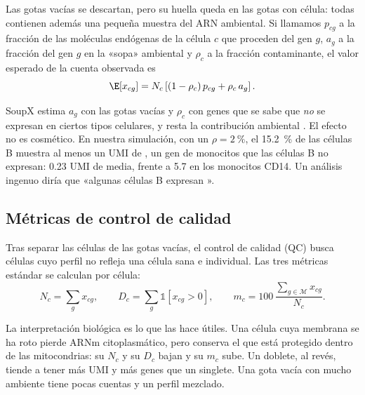 Las gotas vacías se descartan, pero su huella queda en las gotas con célula: todas contienen además una pequeña muestra del ARN ambiental. Si llamamos $p_{cg}$ a la fracción de las moléculas endógenas de la célula $c$ que proceden del gen $g$, $a_g$ a la fracción del gen $g$ en la «sopa» ambiental y $\rho_c$ a la fracción contaminante, el valor esperado de la cuenta observada es
\begin{equation}\label{eq:12-ambiente}
\E[x_{cg}] = N_c\left[(1-\rho_c)\,p_{cg} + \rho_c\,a_g\right].
\end{equation}
\begin{simbolos}
\end{simbolos}
SoupX estima $a_g$ con las gotas vacías y $\rho_c$ con genes que se sabe que \emph{no} se expresan en ciertos tipos celulares, y resta la contribución ambiental \parencite{c12-young2020}. El efecto no es cosmético. En nuestra simulación, con un $\rho=\SI{2}{\percent}$, el \SI{15.2}{\percent} de las células B muestra al menos un UMI de , un gen de monocitos que las células B no expresan: \num{0.23} UMI de media, frente a \num{5.7} en los monocitos CD14. Un análisis ingenuo diría que «algunas células B expresan ».

\subsection{Métricas de control de calidad}

Tras separar las células de las gotas vacías, el control de calidad (QC) busca células cuyo perfil no refleja una célula sana e individual. Las tres métricas estándar \parencite{c12-luecken2019} se calculan por célula:
\begin{equation}\label{eq:12-qc}
N_c=\sum_{g} x_{cg},\qquad
D_c=\sum_g \mathbb{1}[x_{cg}>0],\qquad
m_c = 100\,\frac{\sum_{g\in\mathcal{M}} x_{cg}}{N_c}.
\end{equation}
\begin{simbolos}
\end{simbolos}
La interpretación biológica es lo que las hace útiles. Una célula cuya membrana se ha roto pierde ARNm citoplasmático, pero conserva el que está protegido dentro de las mitocondrias: su $N_c$ y su $D_c$ bajan y su $m_c$ sube. Un doblete, al revés, tiende a tener más UMI y más genes que un singlete. Una gota vacía con mucho ambiente tiene pocas cuentas y un perfil mezclado.

